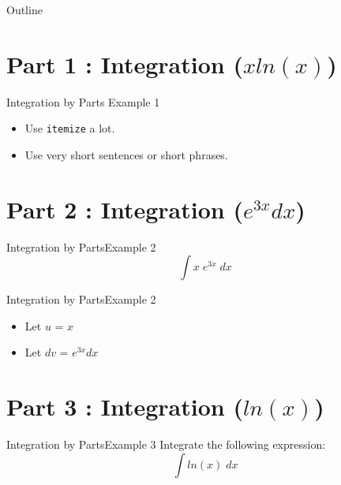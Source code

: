 \documentclass{beamer}
\begin{document}
\begin{frame}{Outline}
  \tableofcontents

\end{frame}
\section{Part 1 : Integration ($x ln(x)$) }


\begin{frame}{Integration by Parts }{Example 1}


  \begin{itemize}
  \item
    Use \texttt{itemize} a lot.
  \item
    Use very short sentences or short phrases.
  \end{itemize}

\end{frame}

\section{Part 2 : Integration ($e^{3x}dx$) }
\begin{frame}{Integration by Parts}{Example 2}
\Large
{
\LARGE
\[ \int x\;e^{3x}\;dx \]
}
\end{frame}

\begin{frame}{Integration by Parts}{Example 2}
\Large

\begin{itemize}
\item Let $u$ = $x$
\item Let $dv$ = $e^{3x}dx$
\end{itemize}

\end{frame}
\section{Part 3 : Integration ($ln(x)$) }

\begin{frame}{Integration by Parts}{Example 3}
\Large
Integrate the following expression:
{
\LARGE
\[ \int ln(x)\;dx \]
}

\end{frame}
\end{document}
